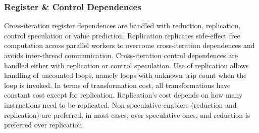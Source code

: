 \subsubsection{Register \& Control Dependences}

Cross-iteration register dependences
are handled with reduction, replication, control speculation or value
prediction. Replication replicates side-effect free computation across
parallel workers to overcome cross-iteration dependences and avoids
inter-thread communication.
%
Cross-iteration control dependences are handled either with
replication or control speculation.
Use of replication allows handling of uncounted loops, namely loops
with unknown trip count when the loop is invoked.
%
In terms of transformation cost, all transformations have constant
cost except for replication.  Replication's cost depends on how many
instructions need to be replicated. Non-speculative enablers
(reduction and replication) are preferred, in most cases, over
speculative ones, and reduction is preferred over replication.


%

%
%
%
%
%
%
%
